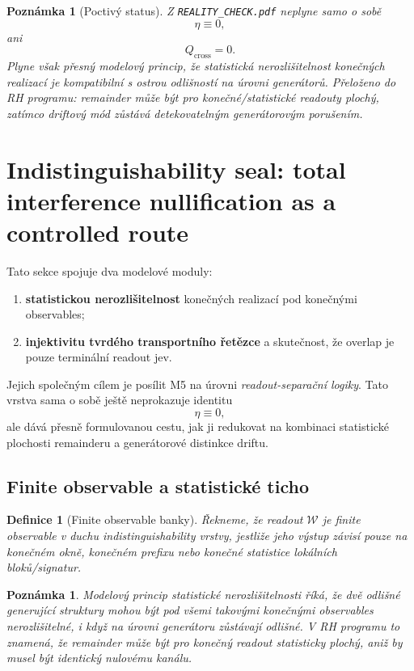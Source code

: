 \documentclass[11pt,a4paper]{article}
\newtheorem{definition}[theorem]{Definice}
\newtheorem{remark}[theorem]{Poznámka}
\begin{document}
\begin{remark}[Poctivý status]
Z \texttt{REALITY\_CHECK.pdf} neplyne samo o sobě
\[
\eta\equiv 0,
\]
ani
\[
Q_{\mathrm{cross}}=0.
\]
Plyne však přesný modelový princip, že \emph{statistická nerozlišitelnost konečných realizací}
je kompatibilní s \emph{ostrou odlišností na úrovni generátorů}. Přeloženo do RH programu:
remainder může být pro konečné/statistické readouty plochý, zatímco driftový mód zůstává
detekovatelným generátorovým porušením.
\end{remark}



\section{Indistinguishability seal: total interference nullification as a controlled route}

Tato sekce spojuje dva modelové moduly:
\begin{enumerate}
    \item \textbf{statistickou nerozlišitelnost} konečných realizací pod konečnými observables;
    \item \textbf{injektivitu tvrdého transportního řetězce} a skutečnost, že overlap je pouze terminální readout jev.
\end{enumerate}
Jejich společným cílem je posílit M5 na úrovni \emph{readout-separační logiky}.
Tato vrstva sama o sobě ještě neprokazuje identitu
\[
\eta \equiv 0,
\]
ale dává přesně formulovanou cestu, jak ji redukovat na kombinaci
statistické plochosti remainderu a generátorové distinkce driftu.

\subsection*{Finite observable a statistické ticho}

\begin{definition}[Finite observable banky]
Řekneme, že readout \(\mathcal W\) je \emph{finite observable} v duchu indistinguishability vrstvy,
jestliže jeho výstup závisí pouze na konečném okně, konečném prefixu nebo konečné statistice
lokálních bloků/signatur.
\end{definition}

\begin{remark}
Modelový princip statistické nerozlišitelnosti říká, že dvě odlišné generující struktury
mohou být pod všemi takovými konečnými observables nerozlišitelné, i když na úrovni generátoru
zůstávají odlišné.
V RH programu to znamená, že remainder může být pro konečný readout statisticky plochý, aniž by
musel být identický nulovému kanálu.
\end{remark}
\end{document}
